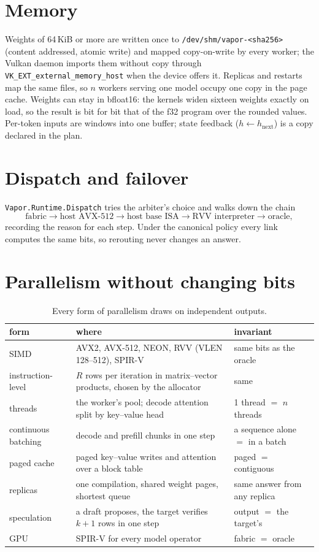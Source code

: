 \section{Memory}

Weights of 64\,KiB or more are written once to \texttt{/dev/shm/vapor-<sha256>} (content addressed,
atomic write) and mapped copy-on-write by every worker; the Vulkan daemon imports them without copy
through \texttt{VK\_EXT\_external\_memory\_host} when the device offers it. Replicas and restarts map the
same files, so $n$ workers serving one model occupy one copy in the page cache. Weights can stay in
bfloat16: the kernels widen sixteen weights exactly on load, so the result is bit for bit that of the
f32 program over the rounded values. Per-token inputs are windows into one buffer; state feedback
($h \leftarrow h_{\text{next}}$) is a copy declared in the plan.

\section{Dispatch and failover}

\texttt{Vapor.Runtime.Dispatch} tries the arbiter's choice and walks down the chain
\[
\text{fabric} \to \text{host AVX-512} \to \text{host base ISA} \to \text{RVV interpreter} \to \text{oracle},
\]
recording the reason for each step. Under the canonical policy every link computes the same bits, so
rerouting never changes an answer.

\section{Parallelism without changing bits}

\begin{table}[h]
\centering\small
\begin{tabularx}{\textwidth}{@{}lXl@{}}
\toprule
form & where & invariant \\
\midrule
SIMD & AVX2, AVX-512, NEON, RVV (VLEN 128--512), SPIR-V & same bits as the oracle \\
instruction-level & $R$ rows per iteration in matrix--vector products, chosen by the allocator & same \\
threads & the worker's pool; decode attention split by key--value head & 1 thread $=$ $n$ threads \\
continuous batching & decode and prefill chunks in one step & a sequence alone $=$ in a batch \\
paged cache & paged key--value writes and attention over a block table & paged $=$ contiguous \\
replicas & one compilation, shared weight pages, shortest queue & same answer from any replica \\
speculation & a draft proposes, the target verifies $k{+}1$ rows in one step & output $=$ the target's \\
GPU & SPIR-V for every model operator & fabric $=$ oracle \\
\bottomrule
\end{tabularx}
\caption{Every form of parallelism draws on independent outputs.}
\end{table}

